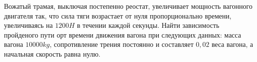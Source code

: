 Вожатый трамая, выключая постепенно реостат, увеличивает мощность
вагонного двигателя так, что сила тяги возрастает от нуля пропорционально
времени, увеличиваясь на $1200 H$ в течении каждой секунды. Найти 
зависимость пройденого пути орт времени движения вагона при следующих 
данных: масса вагона $10 000 kg$, сопротивление трения постоянно и 
составляет $0,02$ веса вагона, а начальная скорость равна нулю.
